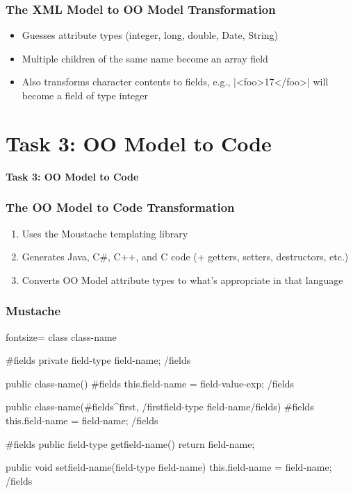 \documentclass{beamer}
\newcommand{\code}{\clojureinline}
\begin{document}
\begin{frame}[fragile]
  \frametitle{The XML Model to OO Model Transformation}
  \begin{itemize}
  \item Guesses attribute types (integer, long, double, Date, String)
  \item Multiple children of the same name become an array field
  \item Also transforms character contents to fields, e.g.,
    \code|<foo>17</foo>| will become a field of type integer
  \end{itemize}
\end{frame}

\section{Task 3: OO Model to Code}

\begin{frame}
  \LARGE
  \begin{center}
    \textbf{Task 3: OO Model to Code}
  \end{center}
\end{frame}

\begin{frame}
  \frametitle{The OO Model to Code Transformation}
  \begin{enumerate}
  \item Uses the Moustache templating library
  \item Generates Java, C\#, C++, and C code (+ getters, setters, destructors,
    etc.)
  \item Converts OO Model attribute types to what's appropriate in that
    language
  \end{enumerate}
\end{frame}

\begin{frame}[fragile]
  \frametitle{Mustache}
  \begin{clojurecode*}{fontsize=\tiny}
class {{{class-name}}} {
    {{#fields}}
    private {{{field-type}}} {{{field-name}}};
    {{/fields}}

    public {{{class-name}}}() {
        {{#fields}}
        this.{{{field-name}}} = {{{field-value-exp}}};
        {{/fields}}
    }

    public {{{class-name}}}({{#fields}}{{^first}}, {{/first}}{{{field-type}}} {{{field-name}}}{{/fields}}) {
        {{#fields}}
        this.{{{field-name}}} = {{{field-name}}};
        {{/fields}}
    }

    {{#fields}}
    public {{{field-type}}} get{{{field-name}}}() {
        return {{{field-name}}};
    }

    public void set{{{field-name}}}({{{field-type}}} {{{field-name}}}) {
        this.{{{field-name}}} = {{{field-name}}};
    }
    {{/fields}}
}
  \end{clojurecode*}
\end{frame}
\end{document}
